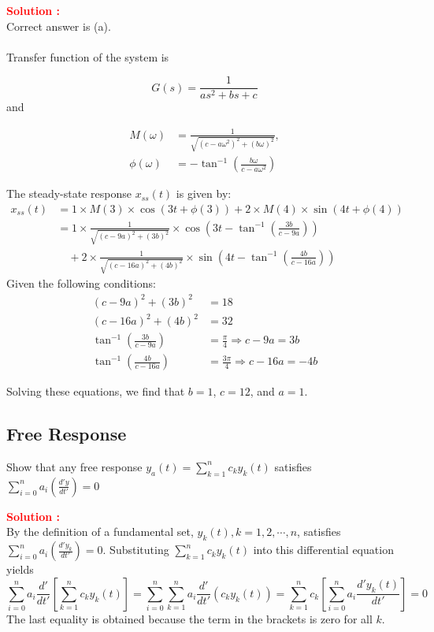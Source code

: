\documentclass[12pt]{article}
\begin{document}
\textbf{\textcolor{red}{Solution :}} \\
Correct answer is (a).\\\\
Transfer function of the system is

\begin{equation}
    G(s) = \frac{1}{as^2 + bs + c}
\end{equation}
and

\begin{align*}
    M(\omega) &= \frac{1}{\sqrt{(c-a\omega^2)^2 + (b\omega)^2}}, \\
    \phi(\omega) &= -\tan^{-1}\left(\frac{b\omega}{c-a\omega^2}\right)
\end{align*}

The steady-state response \( x_{ss}(t) \) is given by:
\begin{align*}
x_{ss}(t) &= 1 \times M(3) \times \cos(3t + \phi(3)) + 2 \times M(4) \times \sin(4t + \phi(4)) \\
&= 1 \times \frac{1}{\sqrt{(c-9a)^2 + (3b)^2}} \times \cos\left(3t - \tan^{-1}\left(\frac{3b}{c-9a}\right)\right) \\
&\quad + 2 \times \frac{1}{\sqrt{(c-16a)^2 + (4b)^2}} \times \sin\left(4t - \tan^{-1}\left(\frac{4b}{c-16a}\right)\right)
\end{align*}
Given the following conditions:
\begin{align*}
    (c-9a)^2 + (3b)^2 &= 18 \\
    (c-16a)^2 + (4b)^2 &= 32 \\
    \tan^{-1}\left(\frac{3b}{c-9a}\right) &= \frac{\pi}{4} \Rightarrow c-9a = 3b \\
   \tan^{-1}\left(\frac{4b}{c-16a}\right) &= \frac{3\pi}{4} \Rightarrow c-16a = -4b
\end{align*}

Solving these equations, we find that \( b = 1 \), \( c = 12 \), and \( a = 1 \).
\clearpage
\subsection{Free Response}

Show that any free response \(y_a(t) = \sum_{k=1}^n c_k y_k(t)\) satisfies \(\sum_{i=0}^n a_i(\frac{d'y}{dt'}) = 0\)


\textbf{\textcolor{red}{Solution :}} \\

By the definition of a fundamental set, \(y_k(t), k=1,2,\cdots,n\), satisfies \(\sum_{i=0}^n a_i(\frac{d'y_k}{dt'}) = 0\). Substituting \(\sum_{k=1}^n c_k y_k(t)\) into this differential equation yields
\begin{equation}
    \sum_{i=0}^n a_i \frac{d'}{dt'} \left[ \sum_{k=1}^n c_k y_k(t) \right] = \sum_{i=0}^n \sum_{k=1}^n a_i \frac{d'}{dt'}(c_k y_k(t)) = \sum_{k=1}^n c_k \left[ \sum_{i=0}^n a_i \frac{d'y_k(t)}{dt'}\right] = 0
\end{equation}
The last equality is obtained because the term in the brackets is zero for all \(k\).
\clearpage
\end{document}
